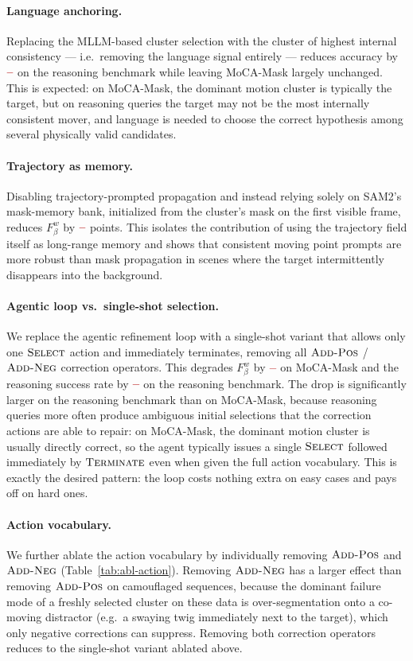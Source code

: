 \documentclass[11pt]{article}
\newcommand{\TBD}{\textcolor{red!70!black}{\textbf{--}}}
\begin{document}
\paragraph{Language anchoring.}
Replacing the MLLM-based cluster selection with the cluster of highest internal consistency --- i.e.\ removing the language signal entirely --- reduces accuracy by $\TBD$ on the reasoning benchmark while leaving MoCA-Mask largely unchanged.
This is expected: on MoCA-Mask, the dominant motion cluster is typically the target, but on reasoning queries the target may not be the most internally consistent mover, and language is needed to choose the correct hypothesis among several physically valid candidates.

\paragraph{Trajectory as memory.}
Disabling trajectory-prompted propagation and instead relying solely on SAM2's mask-memory bank, initialized from the cluster's mask on the first visible frame, reduces $F^w_\beta$ by $\TBD$ points.
This isolates the contribution of using the trajectory field itself as long-range memory and shows that consistent moving point prompts are more robust than mask propagation in scenes where the target intermittently disappears into the background.

\paragraph{Agentic loop vs.\ single-shot selection.}
We replace the agentic refinement loop with a single-shot variant that allows only one $\textsc{Select}$ action and immediately terminates, removing all $\textsc{Add-Pos}$ / $\textsc{Add-Neg}$ correction operators.
This degrades $F^w_\beta$ by $\TBD$ on MoCA-Mask and the reasoning success rate by $\TBD$ on the reasoning benchmark.
The drop is significantly larger on the reasoning benchmark than on MoCA-Mask, because reasoning queries more often produce ambiguous initial selections that the correction actions are able to repair: on MoCA-Mask, the dominant motion cluster is usually directly correct, so the agent typically issues a single $\textsc{Select}$ followed immediately by $\textsc{Terminate}$ even when given the full action vocabulary.
This is exactly the desired pattern: the loop costs nothing extra on easy cases and pays off on hard ones.

\paragraph{Action vocabulary.}
We further ablate the action vocabulary by individually removing $\textsc{Add-Pos}$ and $\textsc{Add-Neg}$ (Table~\ref{tab:abl-action}).
Removing $\textsc{Add-Neg}$ has a larger effect than removing $\textsc{Add-Pos}$ on camouflaged sequences, because the dominant failure mode of a freshly selected cluster on these data is over-segmentation onto a co-moving distractor (e.g.\ a swaying twig immediately next to the target), which only negative corrections can suppress.
Removing both correction operators reduces to the single-shot variant ablated above.
\end{document}
